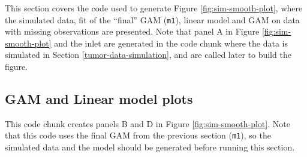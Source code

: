 \documentclass[
]{article}
\newcommand{\passthrough}[1]{#1}
\begin{document}
This section covers the code used to generate Figure \ref{fig:sim-smooth-plot}, where the simulated data, fit of the ``final'' GAM (\passthrough{\lstinline!m1!}), linear model and GAM on data with missing observations are presented. Note that panel A in Figure \ref{fig:sim-smooth-plot} and the inlet are generated in the code chunk where the data is simulated in Section \ref{tumor-data-simulation}, and are called later to build the figure.

\hypertarget{gam-and-linear-model-plots}{%
\subsection{GAM and Linear model plots}\label{gam-and-linear-model-plots}}

This code chunk creates panels B and D in Figure \ref{fig:sim-smooth-plot}. Note that this code uses the final GAM from the previous section (\passthrough{\lstinline!m1!}), so the simulated data and the model should be generated before running this section.
\end{document}

